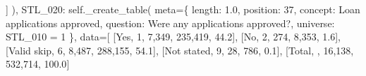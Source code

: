 \documentclass[
  11pt,
  a4paper,
]{article}
\newenvironment{Shaded}{\begin{snugshade}}{\end{snugshade}}
\newcommand{\NormalTok}[1]{\textcolor[rgb]{0.00,0.23,0.31}{#1}}
\newcommand{\OperatorTok}[1]{\textcolor[rgb]{0.37,0.37,0.37}{#1}}
\newcommand{\StringTok}[1]{\textcolor[rgb]{0.13,0.47,0.30}{#1}}
\newcommand{\VariableTok}[1]{\textcolor[rgb]{0.07,0.07,0.07}{#1}}
\begin{document}
\begin{Shaded}
\begin{Highlighting}[]
\NormalTok{                ]}
\NormalTok{            ),}
            \StringTok{\textquotesingle{}STL\_020\textquotesingle{}}\NormalTok{: }\VariableTok{self}\NormalTok{.\_create\_table(}
\NormalTok{                meta}\OperatorTok{=}\NormalTok{\{}
                    \StringTok{\textquotesingle{}length\textquotesingle{}}\NormalTok{: }\StringTok{\textquotesingle{}1.0\textquotesingle{}}\NormalTok{, }\StringTok{\textquotesingle{}position\textquotesingle{}}\NormalTok{: }\StringTok{\textquotesingle{}37\textquotesingle{}}\NormalTok{,}
                    \StringTok{\textquotesingle{}concept\textquotesingle{}}\NormalTok{: }\StringTok{\textquotesingle{}Loan applications approved\textquotesingle{}}\NormalTok{,}
                    \StringTok{\textquotesingle{}question\textquotesingle{}}\NormalTok{: }\StringTok{\textquotesingle{}Were any applications approved?\textquotesingle{}}\NormalTok{,}
                    \StringTok{\textquotesingle{}universe\textquotesingle{}}\NormalTok{: }\StringTok{\textquotesingle{}STL\_010 = 1\textquotesingle{}}
\NormalTok{                \},}
\NormalTok{                data}\OperatorTok{=}\NormalTok{[}
\NormalTok{                    [}\StringTok{\textquotesingle{}Yes\textquotesingle{}}\NormalTok{, }\StringTok{\textquotesingle{}1\textquotesingle{}}\NormalTok{, }\StringTok{\textquotesingle{}7,349\textquotesingle{}}\NormalTok{, }\StringTok{\textquotesingle{}235,419\textquotesingle{}}\NormalTok{, }\StringTok{\textquotesingle{}44.2\textquotesingle{}}\NormalTok{],}
\NormalTok{                    [}\StringTok{\textquotesingle{}No\textquotesingle{}}\NormalTok{, }\StringTok{\textquotesingle{}2\textquotesingle{}}\NormalTok{, }\StringTok{\textquotesingle{}274\textquotesingle{}}\NormalTok{, }\StringTok{\textquotesingle{}8,353\textquotesingle{}}\NormalTok{, }\StringTok{\textquotesingle{}1.6\textquotesingle{}}\NormalTok{],}
\NormalTok{                    [}\StringTok{\textquotesingle{}Valid skip\textquotesingle{}}\NormalTok{, }\StringTok{\textquotesingle{}6\textquotesingle{}}\NormalTok{, }\StringTok{\textquotesingle{}8,487\textquotesingle{}}\NormalTok{, }\StringTok{\textquotesingle{}288,155\textquotesingle{}}\NormalTok{, }\StringTok{\textquotesingle{}54.1\textquotesingle{}}\NormalTok{],}
\NormalTok{                    [}\StringTok{\textquotesingle{}Not stated\textquotesingle{}}\NormalTok{, }\StringTok{\textquotesingle{}9\textquotesingle{}}\NormalTok{, }\StringTok{\textquotesingle{}28\textquotesingle{}}\NormalTok{, }\StringTok{\textquotesingle{}786\textquotesingle{}}\NormalTok{, }\StringTok{\textquotesingle{}0.1\textquotesingle{}}\NormalTok{],}
\NormalTok{                    [}\StringTok{\textquotesingle{}Total\textquotesingle{}}\NormalTok{, }\StringTok{\textquotesingle{}\textquotesingle{}}\NormalTok{, }\StringTok{\textquotesingle{}16,138\textquotesingle{}}\NormalTok{, }\StringTok{\textquotesingle{}532,714\textquotesingle{}}\NormalTok{, }\StringTok{\textquotesingle{}100.0\textquotesingle{}}\NormalTok{]}

\end{Highlighting}
\end{Shaded}
\end{document}
